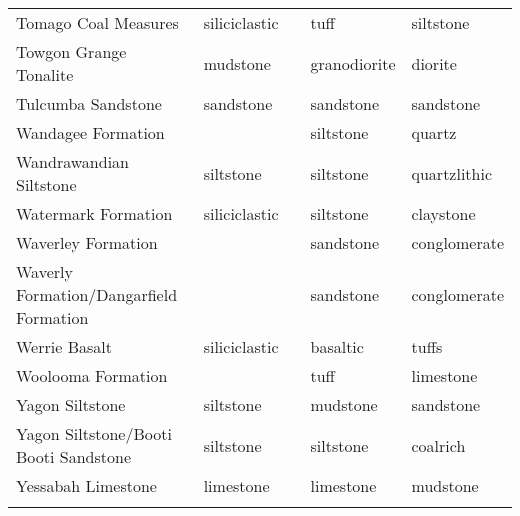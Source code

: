 \begin{tiny}
\begin{longtable}{p{5cm} l l l l}
    Tomago Coal Measures & siliciclastic &  & tuff & siltstone \\ 
    Towgon Grange Tonalite & mudstone &  & granodiorite & diorite \\ 
    Tulcumba Sandstone & sandstone &  & sandstone & sandstone \\ 
    Wandagee Formation &  &  & siltstone & quartz \\ 
    Wandrawandian Siltstone & siltstone &  & siltstone & quartzlithic \\ 
    Watermark Formation & siliciclastic &  & siltstone & claystone \\ 
    Waverley Formation &  &  & sandstone & conglomerate \\ 
    Waverly Formation/Dangarfield  Formation &  &  & sandstone & conglomerate \\ 
    Werrie Basalt & siliciclastic &  & basaltic & tuffs \\ 
    Woolooma Formation &  &  & tuff & limestone \\ 
    Yagon Siltstone & siltstone &  & mudstone & sandstone \\ 
    Yagon Siltstone/Booti Booti Sandstone & siltstone &  & siltstone & coalrich \\ 
    Yessabah Limestone & limestone &  & limestone & mudstone \\ 
    \hline
  \label{tab:form_lith}
\end{longtable}
\end{tiny}
